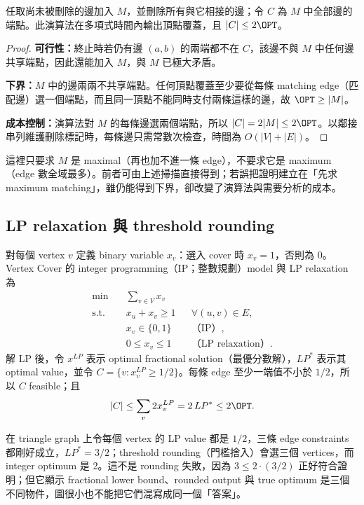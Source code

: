 \documentclass[11pt,a4paper,oneside,openany]{book}
\begin{document}
\begin{theorem}
任取尚未被刪除的邊加入 $M$，並刪除所有與它相接的邊；令 $C$ 為 $M$ 中全部邊的端點。此演算法在多項式時間內輸出頂點覆蓋，且 $|C|\le2\OPT$。
\end{theorem}
\begin{proof}
\textbf{可行性：}終止時若仍有邊 $(a,b)$ 的兩端都不在 $C$，該邊不與 $M$ 中任何邊共享端點，因此還能加入 $M$，與 $M$ 已極大矛盾。

\textbf{下界：}$M$ 中的邊兩兩不共享端點。任何頂點覆蓋至少要從每條 matching edge（匹配邊）選一個端點，而且同一頂點不能同時支付兩條這樣的邊，故 $\OPT\ge|M|$。

\textbf{成本控制：}演算法對 $M$ 的每條邊選兩個端點，所以 $|C|=2|M|\le2\OPT$。以鄰接串列維護刪除標記時，每條邊只需常數次檢查，時間為 $O(|V|+|E|)$。
\end{proof}

這裡只要求 $M$ 是 maximal（再也加不進一條 edge），不要求它是 maximum（edge 數全域最多）。前者可由上述掃描直接得到；若誤把證明建立在「先求 maximum matching」，雖仍能得到下界，卻改變了演算法與需要分析的成本。

\subsection{LP relaxation 與 threshold rounding}
對每個 vertex $v$ 定義 binary variable $x_v$：選入 cover 時 $x_v=1$，否則為 0。Vertex Cover 的 integer programming（IP；整數規劃）model 與 LP relaxation 為
\begin{align*}
\min\quad&\sum_{v\in V}x_v\\
\text{s.t.}\quad&x_u+x_v\ge1 &&\forall (u,v)\in E,\\
&x_v\in\{0,1\} &&\text{（IP）},\\[-.3em]
&0\le x_v\le1 &&\text{（LP relaxation）}.
\end{align*}
解 LP 後，令 $x^{LP}$ 表示 optimal fractional solution（最優分數解），$LP^*$ 表示其 optimal value，並令 $C=\{v:x_v^{LP}\ge1/2\}$。每條 edge 至少一端值不小於 $1/2$，所以 $C$ feasible；且
\[
 |C|\le\sum_v 2x_v^{LP}=2\,LP^*\le2\OPT.
\]

在 triangle graph 上令每個 vertex 的 LP value 都是 $1/2$，三條 edge constraints 都剛好成立，$LP^*=3/2$；threshold rounding（門檻捨入）會選三個 vertices，而 integer optimum 是 2。這不是 rounding 失敗，因為 $3\le2\cdot(3/2)$ 正好符合證明；但它顯示 fractional lower bound、rounded output 與 true optimum 是三個不同物件，圖很小也不能把它們混寫成同一個「答案」。
\end{document}
